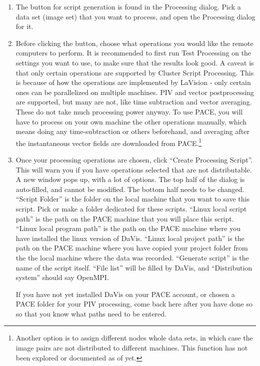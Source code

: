 \documentclass{article}
\newcommand{\quotes}[1]{``#1''}
\begin{document}
	\begin{enumerate}
			\item 	The button for script generation is found in the Processing dialog.  Pick a data set (image set) that you want to process, and open the Processing dialog for it. 
			
			\item 	Before clicking the button, choose what operations you would like the remote computers to perform.  It is recommended to first run Test Processing on the settings you want to use, to make sure that the results look good.  A caveat is that only certain operations are supported by Cluster Script Processing.  This is because of how the operations are implemented by LaVision - only certain ones can be parallelized on multiple machines.  PIV and vector postprocessing are supported, but many are not, like time subtraction and vector averaging.  These do not take much processing power anyway.  To use PACE, you will have to process on your own machine the other operations manually, which means doing any time-subtraction or others beforehand, and averaging after the instantaneous vector fields are downloaded from PACE.\footnote{Another option is to assign different nodes whole data sets, in which case the image pairs are not distributed to different machines.  This function has not been explored or documented as of yet.}
			
			\item	Once your processing operations are chosen, click \quotes{Create Processing Script}.  This will warn you if you have operations selected that are not distributable.  A new window pops up, with a lot of options.  The top half of the dialog is auto-filled, and cannot be modified.  The bottom half needs to be changed.  \quotes{Script Folder} is the folder on the local machine that you want to save this script.  Pick or make a folder dedicated for these scripts.  \quotes{Linux local script path} is the path on the PACE machine that you will place this script.  \quotes{Linux local program path} is the path on the PACE machine where you have installed the linux version of DaVis.  \quotes{Linux local project path} is the path on the PACE machine where you have copied your project folder from the the local machine where the data was recorded.  \quotes{Generate script} is the name of the script itself.  \quotes{File list} will be filled by DaVis, and \quotes{Distribution system} should say OpenMPI.
			
			If you have not yet installed DaVis on your PACE account, or chosen a PACE folder for your PIV processing, come back here after you have done so so that you know what paths need to be entered.
			

\end{enumerate}
\end{document}
